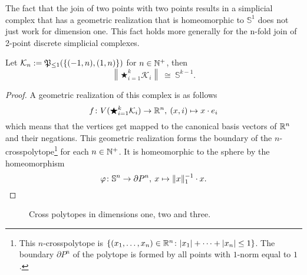 The fact that the join of two points with two points results in a simplicial complex that has a geometric realization that is homeomorphic to $\mathbb{S}^1$ does not just work for dimension one. This fact holds more generally for the n-fold join of 2-point discrete simplicial complexes. 

\begin{lemma}\label{lem:simexkn}
  Let $\mathcal{K}_n := \mathfrak{P}_{\leq 1}(\{(-1, n), (1, n)\})$ for $n \in \mathbb{N}^+$, then
  \begin{equation*}
    \left\lVert \bigstar_{i=1}^k \mathcal{K}_i \right\rVert \: \cong \: \mathbb{S}^{k-1}.
  \end{equation*}
\end{lemma}

\begin{proof}
  A geometric realization of this complex is as follows
  \begin{equation*}
    f\colon V(\bigstar_{i=1}^k \mathcal{K}_i) \to \mathbb{R}^n, \: (x, i) \mapsto x \cdot e_i
  \end{equation*}
  which means that the vertices get mapped to the canonical basis vectors of $\mathbb{R}^n$ and their negations. 
  This geometric realization forms the boundary of the $n$-crosspolytope\footnote{This $n$-crosspolytope is $\{(x_1, \ldots, x_n) \in \mathbb{R}^n\colon |x_1| + \cdots + |x_n| \leq 1 \}$. The boundary $\partial P^n$ of the polytope is formed by all points with $1$-norm equal to $1$.} for each $n \in \mathbb{N}^+$. It is homeomorphic to the sphere by the homeomorphism
  \begin{equation*}
    \varphi\colon \mathbb{S}^n \to \partial P^n, \: x \mapsto \lVert x \rVert_1^{-1} \cdot x. \qedhere 
  \end{equation*}
\end{proof}

\begin{figure}[ht!]
  \centering
  \caption{Cross polytopes in dimensions one, two and three.}
  \label{fig:cross}
\end{figure}

